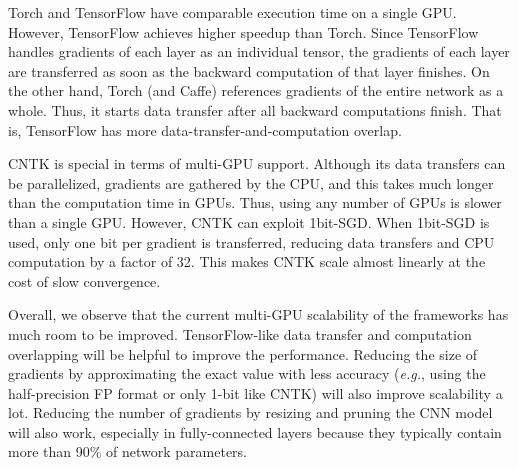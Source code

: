 Torch and TensorFlow have comparable execution time on a single GPU. However, TensorFlow achieves higher speedup than Torch. Since TensorFlow handles gradients of each layer as an individual tensor, the gradients of each layer are transferred as soon as the backward computation of that layer finishes. On the other hand, Torch (and Caffe) references gradients of the entire network as a whole. Thus, it starts data transfer after all backward computations finish. That is, TensorFlow has more data-transfer-and-computation overlap.

CNTK is special in terms of multi-GPU support. Although its data transfers can be parallelized, gradients are gathered by the CPU, and this takes much longer than the computation time in GPUs. Thus, using any number of GPUs is slower than a single GPU. However, CNTK can exploit 1bit-SGD\cite{1-bit-stochastic-gradient-descent-and-application-to-data-parallel-distributed-training-of-speech-dnns}. When 1bit-SGD is used, only one bit per gradient is transferred, reducing data transfers and CPU computation by a factor of 32. This makes CNTK scale almost linearly at the cost of slow convergence.

Overall, we observe that the current multi-GPU scalability of the frameworks has much room to be improved. TensorFlow-like data transfer and computation overlapping will be helpful to improve the performance. Reducing the size of gradients by approximating the exact value with less accuracy (\textit{e.g.}, using the half-precision FP format or only 1-bit like CNTK) will also improve scalability a lot. Reducing the number of gradients by resizing and pruning the CNN model will also work, especially in fully-connected layers because they typically contain more than 90\% of network parameters.
